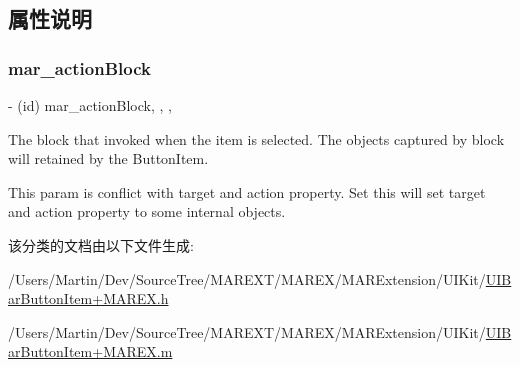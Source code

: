 \subsection{属性说明}
\mbox{\label{category_u_i_bar_button_item_07_m_a_r_e_x_08_a8fed155aa71a12f11fee04ab1e2f9554}} 
\subsubsection{\texorpdfstring{mar\+\_\+action\+Block}{mar\_actionBlock}}
{\footnotesize\ttfamily -\/ (id) mar\+\_\+action\+Block\hspace{0.3cm}{\ttfamily [read]}, {\ttfamily [write]}, {\ttfamily [nonatomic]}, {\ttfamily [copy]}}

The block that invoked when the item is selected. The objects captured by block will retained by the Button\+Item.

This param is conflict with {\ttfamily target} and {\ttfamily action} property. Set this will set {\ttfamily target} and {\ttfamily action} property to some internal objects. 

该分类的文档由以下文件生成\+:\begin{DoxyCompactItemize}
\item 
/\+Users/\+Martin/\+Dev/\+Source\+Tree/\+M\+A\+R\+E\+X\+T/\+M\+A\+R\+E\+X/\+M\+A\+R\+Extension/\+U\+I\+Kit/\hyperlink{_u_i_bar_button_item_09_m_a_r_e_x_8h}{U\+I\+Bar\+Button\+Item+\+M\+A\+R\+E\+X.\+h}\item 
/\+Users/\+Martin/\+Dev/\+Source\+Tree/\+M\+A\+R\+E\+X\+T/\+M\+A\+R\+E\+X/\+M\+A\+R\+Extension/\+U\+I\+Kit/\hyperlink{_u_i_bar_button_item_09_m_a_r_e_x_8m}{U\+I\+Bar\+Button\+Item+\+M\+A\+R\+E\+X.\+m}\end{DoxyCompactItemize}

